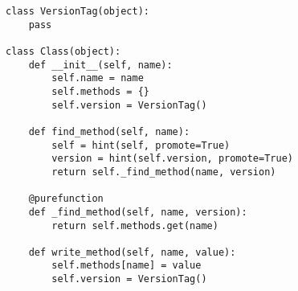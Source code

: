 \begin{lstlisting}[mathescape,basicstyle=\ttfamily]
class VersionTag(object):
    pass

class Class(object):
    def __init__(self, name):
        self.name = name
        self.methods = {}
        self.version = VersionTag()

    def find_method(self, name):
        self = hint(self, promote=True)
        version = hint(self.version, promote=True)
        return self._find_method(name, version)

    @purefunction
    def _find_method(self, name, version):
        return self.methods.get(name)

    def write_method(self, name, value):
        self.methods[name] = value
        self.version = VersionTag()
\end{lstlisting}
